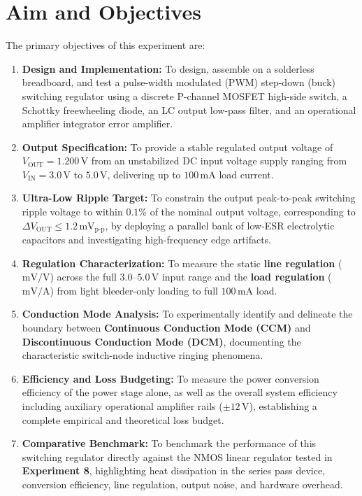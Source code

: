 \documentclass[12pt,a4paper]{article}
\newcommand{\Vout}{V_{\mathrm{OUT}}}
\newcommand{\Vin}{V_{\mathrm{IN}}}
\begin{document}
\tableofcontents
\newpage
\renewcommand{\baselinestretch}{1.12}

\section{Aim and Objectives}
\label{sec:aim}

The primary objectives of this experiment are:
\begin{enumerate}[leftmargin=1.5em]
    \item \textbf{Design and Implementation:} To design, assemble on a solderless breadboard, and test a pulse-width modulated (PWM) step-down (buck) switching regulator using a discrete P-channel MOSFET high-side switch, a Schottky freewheeling diode, an LC output low-pass filter, and an operational amplifier integrator error amplifier.
    \item \textbf{Output Specification:} To provide a stable regulated output voltage of $\Vout = 1.200\,\mathrm{V}$ from an unstabilized DC input voltage supply ranging from $\Vin = 3.0\,\mathrm{V}$ to $5.0\,\mathrm{V}$, delivering up to $100\,\mathrm{mA}$ load current.
    \item \textbf{Ultra-Low Ripple Target:} To constrain the output peak-to-peak switching ripple voltage to within $0.1\%$ of the nominal output voltage, corresponding to $\Delta \Vout \le 1.2\,\mathrm{mV}_{\mathrm{p\text{-}p}}$, by deploying a parallel bank of low-ESR electrolytic capacitors and investigating high-frequency edge artifacts.
    \item \textbf{Regulation Characterization:} To measure the static \textbf{line regulation} ($\mathrm{mV/V}$) across the full $3.0\text{--}5.0\,\mathrm{V}$ input range and the \textbf{load regulation} ($\mathrm{mV/A}$) from light bleeder-only loading to full $100\,\mathrm{mA}$ load.
    \item \textbf{Conduction Mode Analysis:} To experimentally identify and delineate the boundary between \textbf{Continuous Conduction Mode (CCM)} and \textbf{Discontinuous Conduction Mode (DCM)}, documenting the characteristic switch-node inductive ringing phenomena.
    \item \textbf{Efficiency and Loss Budgeting:} To measure the power conversion efficiency of the power stage alone, as well as the overall system efficiency including auxiliary operational amplifier rails ($\pm 12\,\mathrm{V}$), establishing a complete empirical and theoretical loss budget.
    \item \textbf{Comparative Benchmark:} To benchmark the performance of this switching regulator directly against the NMOS linear regulator tested in \textbf{Experiment 8}, highlighting heat dissipation in the series pass device, conversion efficiency, line regulation, output noise, and hardware overhead.
\end{enumerate}
\end{document}
